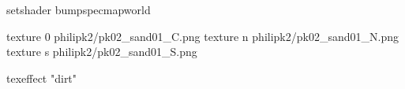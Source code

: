 setshader bumpspecmapworld

texture 0 philipk2/pk02_sand01_C.png
texture n philipk2/pk02_sand01_N.png
texture s philipk2/pk02_sand01_S.png

texeffect "dirt"
